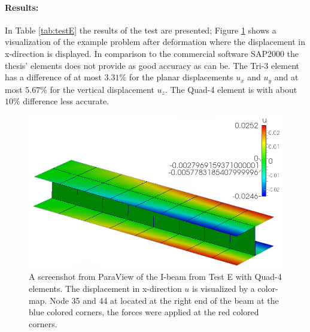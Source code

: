  \paragraph{Results:} In Table \ref{tab:testE} the results of the test are presented; Figure \ref{fig:testEimg} shows a visualization of the example problem after deformation where the displacement in x-direction is displayed. In comparison to the commercial software SAP2000 the thesis' elements does not provide as good accuracy as can be. The Tri-3 element has a difference of at most $3.31\%$ for the planar displacements $u_x$ and $u_y$ and at most $5.67\%$ for the vertical displacement $u_z$. The Quad-4 element is with about $10\%$ difference less accurate.
 \begin{figure}[htbp]
 	\centering
 	\includegraphics[width=0.75\linewidth]{figures/i-beam}
 	\caption{A screenshot from ParaView of the I-beam from Test E with Quad-4 elements. The displacement in x-direction $u$ is visualized by a color-map. Node 35 and 44 at located at the right end of the beam at the blue colored corners, the forces were applied at the red colored corners.}
 	\label{fig:testEimg}
 \end{figure}
